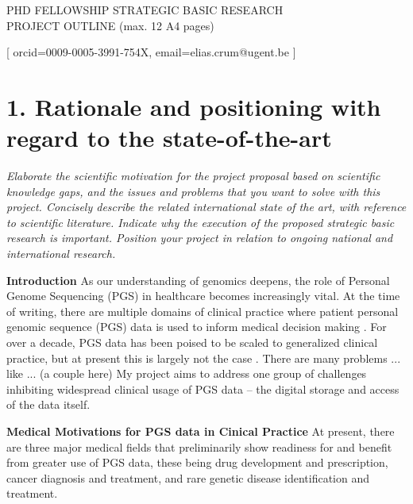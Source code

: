 \documentclass[a4paper,11pt]{article}
\begin{document}
\begin{mdframed}[backgroundcolor=black!17,linecolor=black!0,font=\bfseries]
\centering
PHD FELLOWSHIP STRATEGIC BASIC RESEARCH\\
PROJECT OUTLINE (max. 12 A4 pages)\\
\end{mdframed}
\vspace{-.5\baselineskip}

\author[1,2]{Elias Crum}[
orcid=0009-0005-3991-754X,
email=elias.crum@ugent.be
]

\maketitle

\section{1. Rationale and positioning with regard to the state-of-the-art}
\textit{Elaborate the scientific motivation for the project proposal based on scientific knowledge gaps, and the issues and problems that you want to solve with this project. Concisely describe the related international state of the art, with reference to scientific literature. Indicate why the execution of the proposed strategic basic research is important. Position your project in relation to ongoing national and international research.} 


\textbf{Introduction}
As our understanding of genomics deepens, the role of Personal Genome Sequencing (PGS) in healthcare becomes increasingly vital. 
At the time of writing, there are multiple domains of clinical practice where patient personal genomic sequence (PGS) data is used to inform medical decision making \cite{souche_recommendations_2022, gil_analysis_2015}. 
For over a decade, PGS data has been poised to be scaled to generalized clinical practice, but at present this is largely not the case \cite{alzubi_personal_2014}. 
There are many problems ... like ... (a couple here)
My project aims to address one group of challenges inhibiting widespread clinical usage of PGS data -- the digital storage and access of the data itself. 

\textbf{Medical Motivations for PGS data in Cinical Practice}
At present, there are three major medical fields that preliminarily show readiness for and benefit from greater use of PGS data, these being drug development and prescription, cancer diagnosis and treatment, and rare genetic disease identification and treatment.
\end{document}
